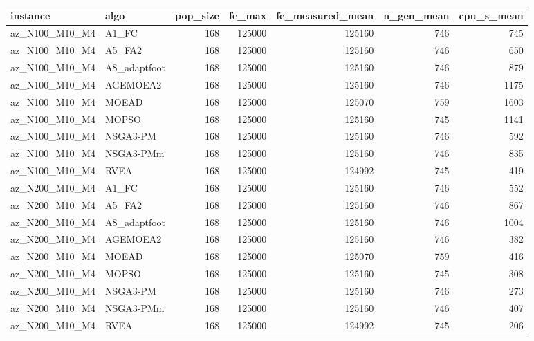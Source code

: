 \begin{tabular}{llrrrrr}
\toprule
instance & algo & pop_size & fe_max & fe_measured_mean & n_gen_mean & cpu_s_mean \\
\midrule
az_N100_M10_M4 & A1_FC & 168 & 125000 & 125160 & 746 & 745 \\
az_N100_M10_M4 & A5_FA2 & 168 & 125000 & 125160 & 746 & 650 \\
az_N100_M10_M4 & A8_adaptfoot & 168 & 125000 & 125160 & 746 & 879 \\
az_N100_M10_M4 & AGEMOEA2 & 168 & 125000 & 125160 & 746 & 1175 \\
az_N100_M10_M4 & MOEAD & 168 & 125000 & 125070 & 759 & 1603 \\
az_N100_M10_M4 & MOPSO & 168 & 125000 & 125160 & 745 & 1141 \\
az_N100_M10_M4 & NSGA3-PM & 168 & 125000 & 125160 & 746 & 592 \\
az_N100_M10_M4 & NSGA3-PMm & 168 & 125000 & 125160 & 746 & 835 \\
az_N100_M10_M4 & RVEA & 168 & 125000 & 124992 & 745 & 419 \\
az_N200_M10_M4 & A1_FC & 168 & 125000 & 125160 & 746 & 552 \\
az_N200_M10_M4 & A5_FA2 & 168 & 125000 & 125160 & 746 & 867 \\
az_N200_M10_M4 & A8_adaptfoot & 168 & 125000 & 125160 & 746 & 1004 \\
az_N200_M10_M4 & AGEMOEA2 & 168 & 125000 & 125160 & 746 & 382 \\
az_N200_M10_M4 & MOEAD & 168 & 125000 & 125070 & 759 & 416 \\
az_N200_M10_M4 & MOPSO & 168 & 125000 & 125160 & 745 & 308 \\
az_N200_M10_M4 & NSGA3-PM & 168 & 125000 & 125160 & 746 & 273 \\
az_N200_M10_M4 & NSGA3-PMm & 168 & 125000 & 125160 & 746 & 407 \\
az_N200_M10_M4 & RVEA & 168 & 125000 & 124992 & 745 & 206 \\
\bottomrule
\end{tabular}
